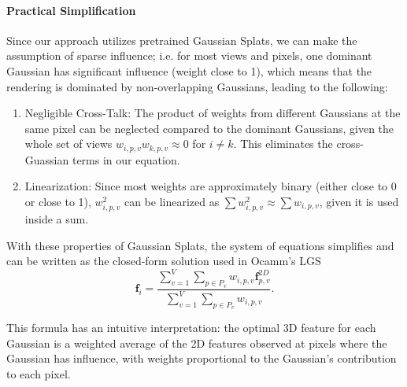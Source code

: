 \paragraph{Practical Simplification}
Since our approach utilizes pretrained Gaussian Splats, we can make the assumption of sparse influence; i.e. for most views and pixels, one dominant Gaussian has significant influence (weight close to 1), which means that the rendering is dominated by non-overlapping Gaussians, leading to the following:
\begin{enumerate}
    \item[(a)] Negligible Cross-Talk: The product of weights from different Gaussians at the same pixel can be neglected compared to the dominant Gaussians, given the whole set of views
    $w_{i,p,v}w_{k,p,v} \approx 0$ for $i \neq k$. This eliminates the cross-Guassian terms in our equation.
    \item[(b)] Linearization: Since most weights are approximately binary (either close to 0 or close to 1), $w_{i,p,v}^2$ can be linearized as $\sum w_{i,p,v}^2 \approx \sum w_{i,p,v}$, given it is used inside a sum.
\end{enumerate}

With these properties of Gaussian Splats, the system of equations simplifies and can be written as the closed-form solution used in Ocamm's LGS
\begin{equation}
    \boxed{
        \mathbf{f}_i = \frac{\sum\limits_{v=1}^V \sum\limits_{p \in P_v} w_{i,p,v}\mathbf{f}_{p,v}^{2D}}{\sum\limits_{v=1}^V \sum\limits_{p \in P_v} w_{i,p,v}}.
    }
\end{equation}

This formula has an intuitive interpretation: the optimal 3D feature for each Gaussian is a weighted average of the 2D features observed at pixels where the Gaussian has influence, with weights proportional to the Gaussian's contribution to each pixel.


